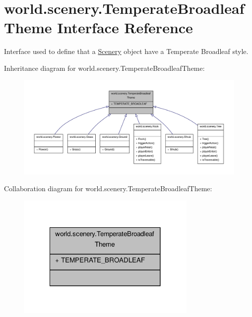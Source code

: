 \hypertarget{interfaceworld_1_1scenery_1_1_temperate_broadleaf_theme}{\section{world.\-scenery.\-Temperate\-Broadleaf\-Theme Interface Reference}
\label{interfaceworld_1_1scenery_1_1_temperate_broadleaf_theme}
}


Interface used to define that a \hyperlink{classworld_1_1scenery_1_1_scenery}{Scenery} object have a Temperate Broadleaf style.  




Inheritance diagram for world.\-scenery.\-Temperate\-Broadleaf\-Theme\-:\nopagebreak
\begin{figure}[H]
\begin{center}
\leavevmode
\includegraphics[width=350pt]{interfaceworld_1_1scenery_1_1_temperate_broadleaf_theme__inherit__graph}
\end{center}
\end{figure}


Collaboration diagram for world.\-scenery.\-Temperate\-Broadleaf\-Theme\-:\nopagebreak
\begin{figure}[H]
\begin{center}
\leavevmode
\includegraphics[width=246pt]{interfaceworld_1_1scenery_1_1_temperate_broadleaf_theme__coll__graph}
\end{center}
\end{figure}
